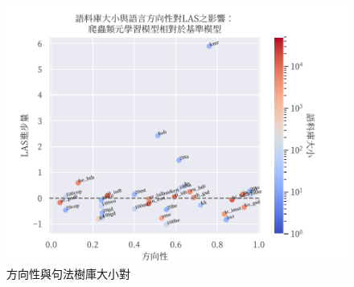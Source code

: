 \begin{figure}[h]
    \centering
    \includegraphics{figs/chapter3/dir_size_las_ft_reptile-to-multi.pdf}
    \caption{方向性與句法樹庫大小對}
    \label{fig:dir-size-las-ft-reptile-to-multi}
\end{figure}